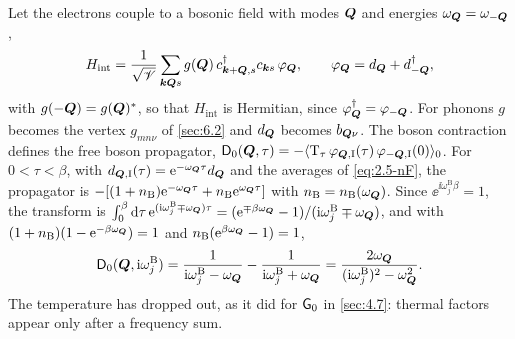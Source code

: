 Let the electrons couple to a bosonic field with modes $\bm{Q}$ and energies $\omega_{\bm{Q}} = \omega_{-\bm{Q}}$,
\begin{equation*}
  H_{\mathrm{int}} = \frac{1}{\sqrt{\mathscr{V}}}\sum_{\bm{k}\bm{Q}s}g(\bm{Q})\,c^\dagger_{\bm{k}+\bm{Q},s}c_{\bm{k}s}\,\varphi_{\bm{Q}}, \qquad
  \varphi_{\bm{Q}} = d_{\bm{Q}} + d^\dagger_{-\bm{Q}} ,
\end{equation*}
with $g(-\bm{Q}) = g(\bm{Q})^*$, so that $H_{\mathrm{int}}$ is Hermitian, since $\varphi_{\bm{Q}}^\dagger = \varphi_{-\bm{Q}}$. For phonons $g$ becomes the vertex $g_{mn\nu}$ of \cref{sec:6.2} and $d_{\bm{Q}}$ becomes $b_{\bm{Q}\nu}$. The boson contraction defines the free boson propagator, $\mathsf{D}_0(\bm{Q},\tau) = -\langle\mathrm{T}_\tau\,\varphi_{\bm{Q},\mathrm{I}}(\tau)\,\varphi_{-\bm{Q},\mathrm{I}}(0)\rangle_0$. For $0 < \tau < \beta$, with $d_{\bm{Q},\mathrm{I}}(\tau) = \mathrm{e}^{-\omega_{\bm{Q}}\tau}d_{\bm{Q}}$ and the averages of \cref{eq:2.5-nF}, the propagator is $-[(1 + n_{\mathrm{B}})\mathrm{e}^{-\omega_{\bm{Q}}\tau} + n_{\mathrm{B}}\mathrm{e}^{\omega_{\bm{Q}}\tau}]$ with $n_{\mathrm{B}} = n_{\mathrm{B}}(\omega_{\bm{Q}})$. Since $\ee^{\ii\omega^{\mathrm{B}}_j\beta} = 1$, the transform is $\int_0^\beta\mathrm{d}\tau\,\mathrm{e}^{(\mathrm{i}\omega^{\mathrm{B}}_j \mp \omega_{\bm{Q}})\tau} = (\mathrm{e}^{\mp\beta\omega_{\bm{Q}}} - 1)/(\mathrm{i}\omega^{\mathrm{B}}_j \mp \omega_{\bm{Q}})$, and with $(1 + n_{\mathrm{B}})(1 - \mathrm{e}^{-\beta\omega_{\bm{Q}}}) = 1$ and $n_{\mathrm{B}}(\mathrm{e}^{\beta\omega_{\bm{Q}}} - 1) = 1$,
\begin{equation}
  \mathsf{D}_0(\bm{Q},\mathrm{i}\omega^{\mathrm{B}}_j) = \frac{1}{\mathrm{i}\omega^{\mathrm{B}}_j - \omega_{\bm{Q}}} - \frac{1}{\mathrm{i}\omega^{\mathrm{B}}_j + \omega_{\bm{Q}}} = \frac{2\omega_{\bm{Q}}}{(\mathrm{i}\omega^{\mathrm{B}}_j)^2 - \omega_{\bm{Q}}^2} .
  \label{eq:D.11-D0}
\end{equation}
The temperature has dropped out, as it did for $\mathsf{G}_0$ in \cref{sec:4.7}: thermal factors appear only after a frequency sum.

